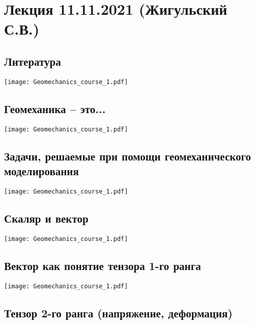 \documentclass[main.tex]{subfiles}
\begin{document}
\section{Лекция 11.11.2021 (Жигульский С.В.)}

\subsection{Литература}

\begin{center}
\texttt{[image: Geomechanics\_course\_1.pdf]}
\end{center}

\subsection{Геомеханика -- это...}

\begin{center}
\texttt{[image: Geomechanics\_course\_1.pdf]}
\end{center}

\subsection{Задачи, решаемые при помощи геомеханического моделирования}

\begin{center}
\texttt{[image: Geomechanics\_course\_1.pdf]}
\end{center}

\subsection{Скаляр и вектор}

\begin{center}
\texttt{[image: Geomechanics\_course\_1.pdf]}
\end{center}

\subsection{Вектор как понятие тензора 1-го ранга}

\begin{center}
\texttt{[image: Geomechanics\_course\_1.pdf]}
\end{center}

\subsection{Тензор 2-го ранга (напряжение, деформация)}
\end{document}
